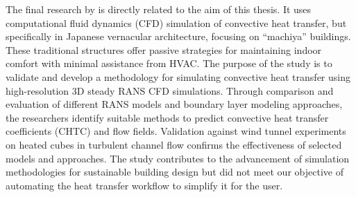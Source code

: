 The final research by \citeauthor{litrev2} \cite{litrev2} is directly related to the aim of this thesis. 
It uses computational fluid dynamics (CFD) simulation of convective heat transfer, but specifically in Japanese vernacular architecture, focusing on “machiya” buildings. These traditional structures offer passive strategies for maintaining indoor comfort with minimal assistance from HVAC. The purpose of the study is to validate and develop a methodology for simulating convective heat transfer using high-resolution 3D steady \gls{RANS} CFD simulations. Through comparison and evaluation of different \gls{RANS} models and boundary layer modeling approaches, the researchers identify suitable methods to predict convective heat transfer coefficients (\gls{CHTC}) and flow fields. Validation against wind tunnel experiments on heated cubes in turbulent channel flow confirms the effectiveness of selected models and approaches. The study contributes to the advancement of simulation methodologies for sustainable building design but did not meet our objective of automating the heat transfer workflow to simplify it for the user. 



